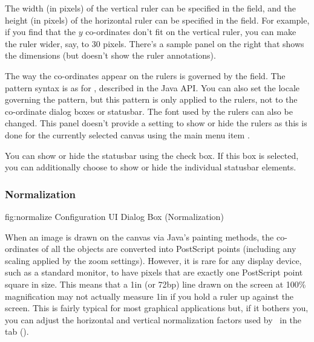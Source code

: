 The width (in pixels) of the vertical ruler can be specified in the
 field, and the height (in pixels) of
the horizontal ruler can be specified in the
 field. For example, if you find that
the $y$ co-ordinates don't fit on the vertical ruler, you can make the
ruler wider, say, to 30 pixels. There's a sample panel on the right
that shows the dimensions (but doesn't show the ruler annotations).

The way the co-ordinates appear on the rulers is governed by the
 field.  The pattern syntax is as for
\href{https://docs.oracle.com/javase/8/docs/api/java/text/DecimalFormat.html}{},
described in the Java API.  You can also set the locale governing
the pattern, but this pattern is only applied to the \glspl{ruler},
not to the co-ordinate dialog boxes or \gls{statusbar}. The font
used by the rulers can also be changed.  This panel doesn't provide
a setting to show or hide the rulers as this is done for the
currently selected \gls{canvas} using the main menu item
.

You can show or hide the \gls{statusbar} using the
 check box. If this box is
selected, you can additionally choose to show or hide the
individual \gls{statusbar} elements.


\subsubsection{Normalization}\label{sec:normalize}


\FloatFig
  {fig:normalize}
  {}
  {Configuration UI Dialog Box (Normalization)}

When an image is drawn on the \gls{canvas} via Java's painting
methods, the co-ordinates of all the objects are converted into
PostScript points (including any scaling applied by the zoom
settings). However, it is rare for any display device, such as a
standard monitor, to have pixels that are exactly one PostScript point square
in size. This means that a 1in (or 72\gls{bp}) line drawn on the
screen at 100\% magnification may not actually measure 1in if you
hold a ruler up against the screen. This is fairly typical for
most graphical applications but, if it bothers you, you can
adjust the horizontal and vertical normalization factors used by
\FlowframTk\ in the  tab
().

